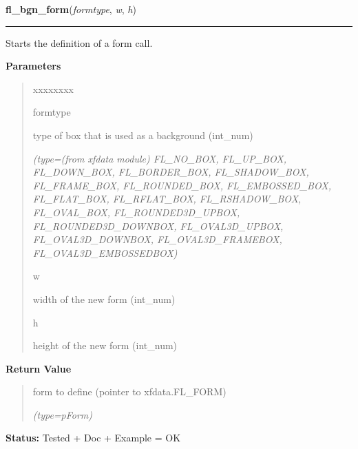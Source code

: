 \hspace{.8\funcindent}\begin{boxedminipage}{\funcwidth}

    \raggedright \textbf{fl\_bgn\_form}(\textit{formtype}, \textit{w}, \textit{h})

    \vspace{-1.5ex}

    \rule{\textwidth}{0.5\fboxrule}
\setlength{\parskip}{2ex}
    Starts the definition of a form call.

\setlength{\parskip}{1ex}
      \textbf{Parameters}
      \vspace{-1ex}

      \begin{quote}
        \begin{Ventry}{xxxxxxxx}

          \item[formtype]

          type of box that is used as a background (int\_num)

            {\it (type=(from xfdata module) FL\_NO\_BOX, FL\_UP\_BOX, FL\_DOWN\_BOX, 
FL\_BORDER\_BOX, FL\_SHADOW\_BOX, FL\_FRAME\_BOX, FL\_ROUNDED\_BOX, 
FL\_EMBOSSED\_BOX, FL\_FLAT\_BOX, FL\_RFLAT\_BOX, FL\_RSHADOW\_BOX, 
FL\_OVAL\_BOX, FL\_ROUNDED3D\_UPBOX, FL\_ROUNDED3D\_DOWNBOX, 
FL\_OVAL3D\_UPBOX, FL\_OVAL3D\_DOWNBOX, FL\_OVAL3D\_FRAMEBOX, 
FL\_OVAL3D\_EMBOSSEDBOX)}

          \item[w]

          width of the new form (int\_num)

          \item[h]

          height of the new form (int\_num)

        \end{Ventry}

      \end{quote}

      \textbf{Return Value}
    \vspace{-1ex}

      \begin{quote}
      form to define (pointer to xfdata.FL\_FORM)

      {\it (type=pForm)}

      \end{quote}

\textbf{Status:} Tested + Doc + Example = OK



    \end{boxedminipage}


